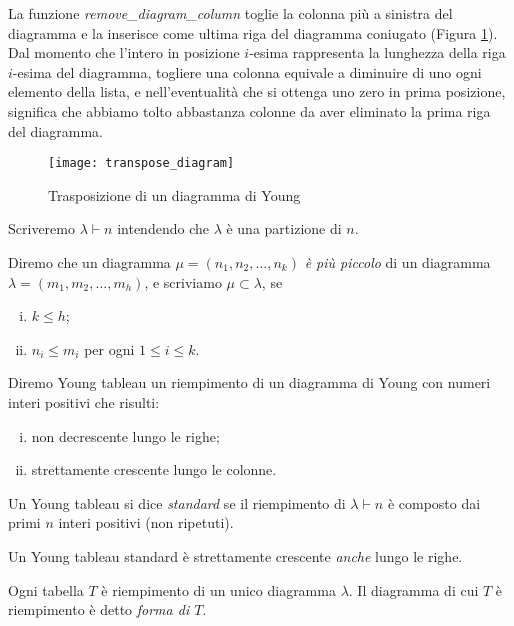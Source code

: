 La funzione \emph{remove\_diagram\_column} toglie la colonna pi\`u a
sinistra del diagramma e la inserisce come ultima riga del diagramma
coniugato (Figura \ref{fig:transpose_diagram}). 
Dal momento che l'intero in posizione $i$-esima rappresenta
la lunghezza della riga $i$-esima del diagramma, togliere una colonna
equivale a diminuire di uno ogni elemento della lista, e
nell'eventualit\`a che si ottenga uno zero in prima posizione,
significa che abbiamo tolto abbastanza colonne da aver eliminato la
prima riga del diagramma.

\begin{figure}[h]
\centering
\texttt{[image: transpose\_diagram]}
\caption{Trasposizione di un diagramma di Young}
\label{fig:transpose_diagram}
\end{figure}

\begin{notaz}
Scriveremo $\lambda \vdash n$ intendendo che $\lambda$ \`e una
partizione di $n$.
\end{notaz}

\begin{defn}
Diremo che un diagramma $\mu=(n_1,n_2,\dots,n_k)$ \emph{\`e pi\`u
piccolo} di un diagramma $\lambda=(m_1,m_2,\dots,m_h)$, e scriviamo
$\mu \subset \lambda$, se
\begin{enumerate}[(i)]
\item $k \leq h$;
\item $n_i \leq m_i$ per ogni $1 \leq i \leq k$.
\end{enumerate}
\end{defn}

\begin{defn}\label{ytab}
Diremo Young tableau un riempimento di un diagramma di Young con
numeri interi positivi che risulti:
\begin{enumerate}[(i)]
\item non decrescente lungo le righe;
\item strettamente crescente lungo le colonne.
\end{enumerate}
Un Young tableau si dice \emph{standard} se il riempimento di
$\lambda \vdash n$ \`e composto dai primi $n$ interi positivi (non
ripetuti).
\end{defn}

\begin{oss}
Un Young tableau standard \`e strettamente crescente \emph{anche}
lungo le righe.
\end{oss}

\begin{oss}
Ogni tabella $T$ \`e riempimento di un unico diagramma $\lambda$. Il
diagramma di cui $T$ \`e riempimento \`e detto \emph{forma di $T$}.
\end{oss}

